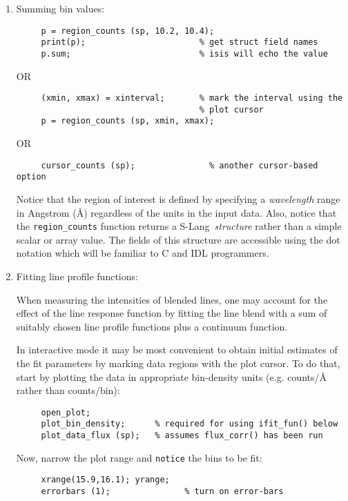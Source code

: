 \documentclass{book}
\newcommand{\slang}{{\sc S-Lang}}
\begin{document}
  \begin{enumerate}
  \item Summing bin values:

     \begin{verbatim}
     p = region_counts (sp, 10.2, 10.4);
     print(p);                       % get struct field names
     p.sum;                          % isis will echo the value
     \end{verbatim}
     OR
     \begin{verbatim}
     (xmin, xmax) = xinterval;       % mark the interval using the
                                     % plot cursor
     p = region_counts (sp, xmin, xmax);
     \end{verbatim}
     OR
     \begin{verbatim}
     cursor_counts (sp);               % another cursor-based option
     \end{verbatim}

Notice that the region of interest is defined by specifying a {\it
wavelength} range in Angstrom (\AA) regardless of the units in the input
data. Also, notice that the {\tt region\_counts} function returns a \slang\
{\it structure} rather than a simple scalar or array value.  The fields of
this structure are accessible using the dot notation which will be familiar
to C and IDL programmers.

  \item Fitting line profile functions:

When measuring the intensities of blended lines, one may account for the
effect of the line response function by fitting the line blend with a sum of
suitably chosen line profile functions plus a continuum function.

In interactive mode it may be most convenient to obtain initial estimates of
the fit parameters by marking data regions with the plot cursor. To do that,
start by plotting the data in appropriate bin-density units (e.g. counts/\AA~
rather than counts/bin):

     \begin{verbatim}
     open_plot;
     plot_bin_density;      % required for using ifit_fun() below
     plot_data_flux (sp);   % assumes flux_corr() has been run
     \end{verbatim}

Now, narrow the plot range and {\tt notice} the
bins to be fit:

     \begin{verbatim}
     xrange(15.9,16.1); yrange;
     errorbars (1);               % turn on error-bars


\end{verbatim}
\end{enumerate}
\end{document}

